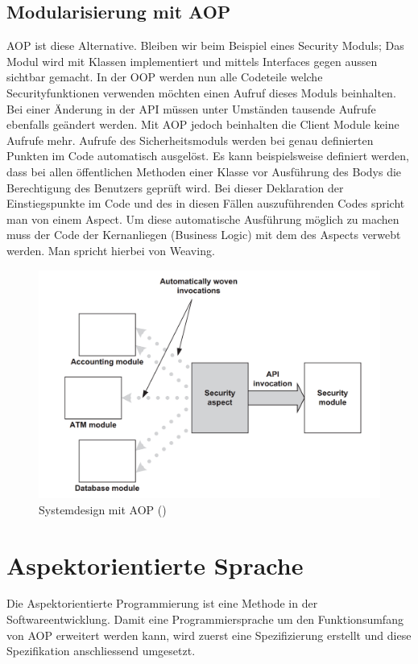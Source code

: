 \subsection{Modularisierung mit AOP}
\label{sec:aop_modaop}
AOP ist diese Alternative. Bleiben wir beim Beispiel eines Security Moduls; Das Modul wird mit Klassen implementiert und mittels Interfaces gegen aussen sichtbar gemacht. In der OOP werden nun alle Codeteile welche Securityfunktionen verwenden möchten einen Aufruf dieses Moduls beinhalten. Bei einer Änderung in der API müssen unter Umständen tausende Aufrufe ebenfalls geändert werden. Mit AOP jedoch beinhalten die Client Module keine Aufrufe mehr. Aufrufe des Sicherheitsmoduls werden bei genau definierten Punkten im Code automatisch ausgelöst. Es kann beispielsweise definiert werden, dass bei allen öffentlichen Methoden einer Klasse vor Ausführung des Bodys die Berechtigung des Benutzers geprüft wird. Bei dieser Deklaration der Einstiegspunkte im Code und des in diesen Fällen auszuführenden Codes spricht man von einem Aspect. Um diese automatische Ausführung möglich zu machen muss der Code der Kernanliegen (Business Logic) mit dem des Aspects verwebt werden. Man spricht hierbei von Weaving.
\begin{figure}[H]
	\centering
		\includegraphics[scale=0.5]{bilder/motivationAop}
	\caption{Systemdesign mit AOP (\cite[p~55]{laddad:aspectj})}
	\label{fig:motivationaop}
\end{figure}

\section{Aspektorientierte Sprache}
\label{sec:aop_lang}
Die Aspektorientierte Programmierung ist eine Methode in der Softwareentwicklung. Damit eine Programmiersprache um den Funktionsumfang von AOP erweitert werden kann, wird zuerst eine Spezifizierung erstellt und diese Spezifikation anschliessend umgesetzt.
